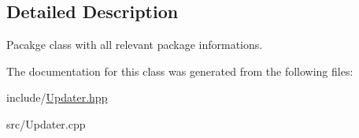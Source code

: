 \subsection{Detailed Description}
Pacakge class with all relevant package informations. 

The documentation for this class was generated from the following files\-:\begin{DoxyCompactItemize}
\item 
include/\hyperlink{Updater_8hpp}{Updater.\-hpp}\item 
src/Updater.\-cpp\end{DoxyCompactItemize}
